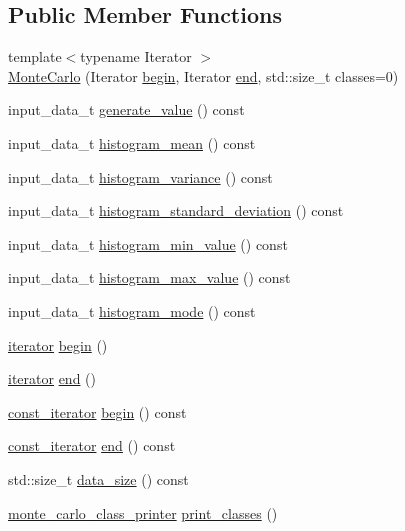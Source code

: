 \subsection*{Public Member Functions}
\begin{DoxyCompactItemize}
\item 
{\footnotesize template$<$typename Iterator $>$ }\\\hyperlink{classMonteCarlo_a7b779a6815e26603f4c18e56195bd050}{Monte\+Carlo} (Iterator \hyperlink{classMonteCarlo_ab9578a53842f7df281ad198f195f3c47}{begin}, Iterator \hyperlink{classMonteCarlo_a52b4ed803009aa163306b63796827d61}{end}, std\+::size\+\_\+t classes=0)
\item 
input\+\_\+data\+\_\+t \hyperlink{classMonteCarlo_a32ac50ed9ba5bf78398681192ccfc301}{generate\+\_\+value} () const
\item 
input\+\_\+data\+\_\+t \hyperlink{classMonteCarlo_a0eec2f41498ce1c18d70967a1ce90c29}{histogram\+\_\+mean} () const
\item 
input\+\_\+data\+\_\+t \hyperlink{classMonteCarlo_a06304df8a3012e772db198f6338ebc51}{histogram\+\_\+variance} () const
\item 
input\+\_\+data\+\_\+t \hyperlink{classMonteCarlo_a444d97838d7f3f04cbbaf11d2f514887}{histogram\+\_\+standard\+\_\+deviation} () const
\item 
input\+\_\+data\+\_\+t \hyperlink{classMonteCarlo_a49567ab1184a37aa847566728384bd57}{histogram\+\_\+min\+\_\+value} () const
\item 
input\+\_\+data\+\_\+t \hyperlink{classMonteCarlo_a21d7ee80b6b7fb92e620008754934541}{histogram\+\_\+max\+\_\+value} () const
\item 
input\+\_\+data\+\_\+t \hyperlink{classMonteCarlo_aad9154200dcbb94c5ddd15c98e38f08d}{histogram\+\_\+mode} () const
\item 
\hyperlink{classMonteCarlo_a8f83ff48a51d2f19e5c87b8fade7bbe3}{iterator} \hyperlink{classMonteCarlo_ab9578a53842f7df281ad198f195f3c47}{begin} ()
\item 
\hyperlink{classMonteCarlo_a8f83ff48a51d2f19e5c87b8fade7bbe3}{iterator} \hyperlink{classMonteCarlo_a52b4ed803009aa163306b63796827d61}{end} ()
\item 
\hyperlink{classMonteCarlo_a74dc0884e3b02002956de4fb84a0bb01}{const\+\_\+iterator} \hyperlink{classMonteCarlo_a9d5ce89a44acd99626bed6351091e981}{begin} () const
\item 
\hyperlink{classMonteCarlo_a74dc0884e3b02002956de4fb84a0bb01}{const\+\_\+iterator} \hyperlink{classMonteCarlo_a6e15e3a5a96163b8cc84ec9892c2e88b}{end} () const
\item 
std\+::size\+\_\+t \hyperlink{classMonteCarlo_a994af145a2a63a51c96a13d6e472b793}{data\+\_\+size} () const
\item 
\hyperlink{structMonteCarlo_1_1monte__carlo__class__printer}{monte\+\_\+carlo\+\_\+class\+\_\+printer} \hyperlink{classMonteCarlo_a736ca6442900d47116bc040c284ac69f}{print\+\_\+classes} ()
\end{DoxyCompactItemize}


